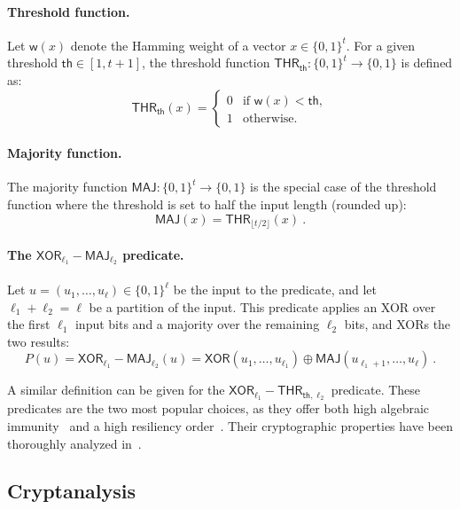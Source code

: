 \documentclass[journal=tosc,submission]{iacrtrans}
\theoremstyle{theorem}
\begin{document}
\paragraph{Threshold function.} Let $\mathsf{w}(x)$ denote the Hamming weight of a vector $x \in \{0,1\}^t$. For a given threshold $\mathsf{th} \in [1, t+1]$, the threshold function $\mathsf{THR}_{\mathsf{th}} : \{0,1\}^t \to \{0,1\}$ is defined as:
$$
\mathsf{THR}_{\mathsf{th}}(x) = 
\begin{cases}
0 & \text{if } \mathsf{w}(x) < \mathsf{th}, \\
1 & \text{otherwise}.
\end{cases}
$$

\paragraph{Majority function.} The majority function $\mathsf{MAJ} : \{0,1\}^t \to \{0,1\}$ is the special case of the threshold function where the threshold is set to half the input length (rounded up):
$$
\mathsf{MAJ}(x) = \mathsf{THR}_{\lfloor t/2 \rfloor}(x)~.
$$



\paragraph{The $\mathsf{XOR}_{\ell_1}-\mathsf{MAJ}_{\ell_2}$ predicate.} Let $u = (u_1, \ldots, u_\ell) \in \{0,1\}^\ell$ be the input to the predicate, and let $\ell_1 + \ell_2 = \ell$ be a partition of the input. This predicate applies an XOR over the first $\ell_1$ input bits and a majority over the remaining $\ell_2$ bits, and XORs the two results:
$$
P(u) = \mathsf{XOR}_{\ell_1}-\mathsf{MAJ}_{\ell_2}(u) = \mathsf{XOR}(u_1, \ldots, u_{\ell_1}) \oplus \mathsf{MAJ}(u_{\ell_1+1}, \ldots, u_\ell)~.
$$

A similar definition can be given for the $\mathsf{XOR}_{\ell_1}-\mathsf{THR}_{\mathsf{th},\ell_2}$ predicate. These predicates are the two most popular choices, as they offer both high algebraic immunity~\cite{C:Courtois03,EC:CouMei03} and a high resiliency order~\cite{DBLP:journals/tit/Siegenthaler84}. Their cryptographic properties have been thoroughly analyzed in~\cite{DBLP:journals/ccds/Meaux21,DBLP:journals/dam/Meaux22}.  

\subsection{Cryptanalysis}
\end{document}
